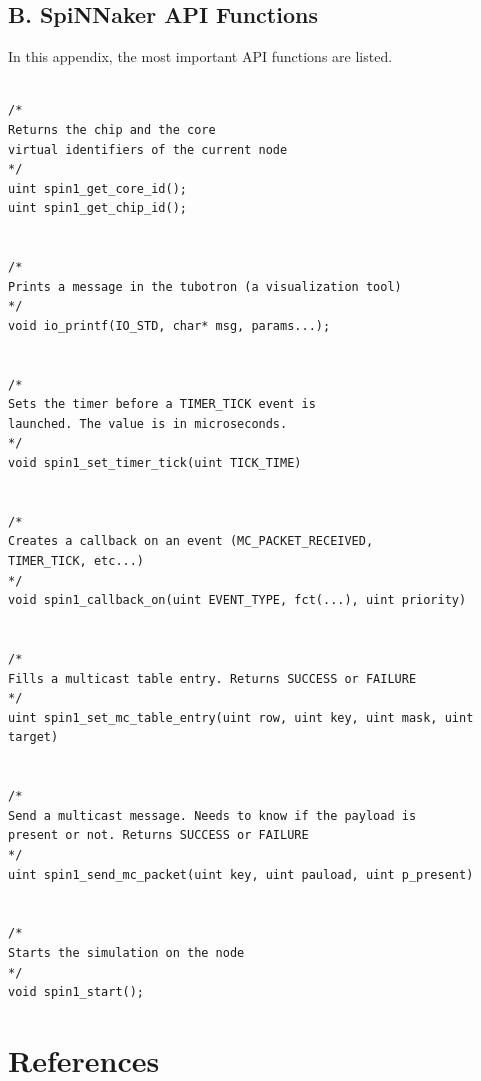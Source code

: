 \documentclass{article}
\begin{document}
\subsection*{B. SpiNNaker API Functions}
In this appendix, the most important API functions are listed.
\begin{verbatim}

/*
Returns the chip and the core 
virtual identifiers of the current node
*/
uint spin1_get_core_id();
uint spin1_get_chip_id();


/*
Prints a message in the tubotron (a visualization tool)
*/
void io_printf(IO_STD, char* msg, params...);


/*
Sets the timer before a TIMER_TICK event is
launched. The value is in microseconds.
*/
void spin1_set_timer_tick(uint TICK_TIME)

	
/*
Creates a callback on an event (MC_PACKET_RECEIVED,
TIMER_TICK, etc...)
*/
void spin1_callback_on(uint EVENT_TYPE, fct(...), uint priority)


/*
Fills a multicast table entry. Returns SUCCESS or FAILURE
*/
uint spin1_set_mc_table_entry(uint row, uint key, uint mask, uint target)


/*
Send a multicast message. Needs to know if the payload is
present or not. Returns SUCCESS or FAILURE
*/
uint spin1_send_mc_packet(uint key, uint pauload, uint p_present)


/*
Starts the simulation on the node
*/
void spin1_start();
\end{verbatim}


\section{References}
\end{document}
